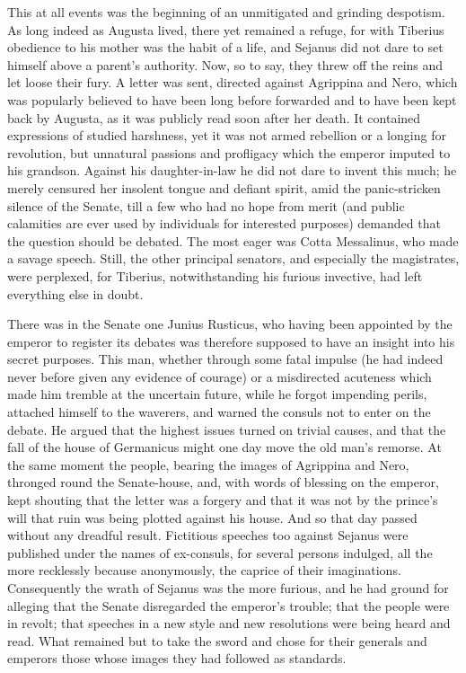 This at all events was the beginning of an unmitigated and grinding despotism. As long indeed as Augusta lived, there yet remained a refuge, for with Tiberius obedience to his mother was the habit of a life, and Sejanus did not dare to set himself above a parent's authority. Now, so to say, they threw off the reins and let loose their fury. A letter was sent, directed against Agrippina and Nero, which was popularly believed to have been long before forwarded and to have been kept back by Augusta, as it was publicly read soon after her death. It contained expressions of studied harshness, yet it was not armed rebellion or a longing for revolution, but unnatural passions and profligacy which the emperor imputed to his grandson. Against his daughter-in-law he did not dare to invent this much; he merely censured her insolent tongue and defiant spirit, amid the panic-stricken silence of the Senate, till a few who had no hope from merit (and public calamities are ever used by individuals for interested purposes) demanded that the question should be debated. The most eager was Cotta Messalinus, who made a savage speech. Still, the other principal senators, and especially the magistrates, were perplexed, for Tiberius, notwithstanding his furious invective, had left everything else in doubt.


There was in the Senate one Junius Rusticus, who having been appointed by the emperor to register its debates was therefore supposed to have an insight into his secret purposes. This man, whether through some fatal impulse (he had indeed never before given any evidence of courage) or a misdirected acuteness which made him tremble at the uncertain future, while he forgot impending perils, attached himself to the waverers, and warned the consuls not to enter on the debate. He argued that the highest issues turned on trivial causes, and that the fall of the house of Germanicus might one day move the old man's remorse. At the same moment the people, bearing the images of Agrippina and Nero, thronged round the Senate-house, and, with words of blessing on the emperor, kept shouting that the letter was a forgery and that it was not by the prince's will that ruin was being plotted against his house. And so that day passed without any dreadful result. Fictitious speeches too against Sejanus were published under the names of ex-consuls, for several persons indulged, all the more recklessly because anonymously, the caprice of their imaginations. Consequently the wrath of Sejanus was the more furious, and he had ground for alleging that the Senate disregarded the emperor's trouble; that the people were in revolt; that speeches in a new style and new resolutions were being heard and read. What remained but to take the sword and chose for their generals and emperors those whose images they had followed as standards.

